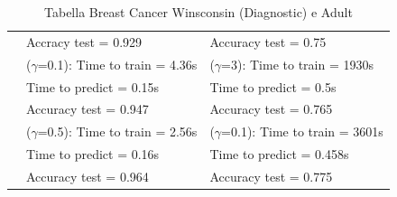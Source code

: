 \documentclass{article}
\begin{document}
\begin{table}[htbp]
\begin{adjustbox}{width=\textwidth}
\begin{tabularx}{\textwidth}{|>{\centering\arraybackslash}X|>{\centering\arraybackslash}X|>{\centering\arraybackslash}X|}
	  & Accracy test = 0.929 & Accuracy test = 0.75\\
	  & ($\gamma$=0.1): Time to train = 4.36s & ($\gamma$=3): Time to train = 1930s\\
	  & Time to predict = 0.15s & Time to predict = 0.5s\\
	  & Accuracy test = 0.947 & Accuracy test = 0.765\\
	  & ($\gamma$=0.5): Time to train = 2.56s & ($\gamma$=0.1): Time to train = 3601s\\
	  & Time to predict = 0.16s & Time to predict = 0.458s\\
	  & Accuracy test = 0.964 & Accuracy test = 0.775\\
	  \hline
	  \end{tabularx}
    \end{adjustbox}
	\caption{Tabella Breast Cancer Winsconsin (Diagnostic) e Adult}
  \end{table}
\end{document}
